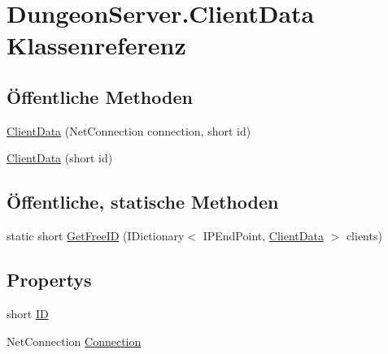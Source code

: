 \hypertarget{class_dungeon_server_1_1_client_data}{\section{Dungeon\-Server.\-Client\-Data Klassenreferenz}
\label{class_dungeon_server_1_1_client_data}
}
\subsection*{Öffentliche Methoden}
\begin{DoxyCompactItemize}
\item 
\hyperlink{class_dungeon_server_1_1_client_data_a0fbe7a06af78e568dbe1ee32dd9a2a30}{Client\-Data} (Net\-Connection connection, short id)
\item 
\hyperlink{class_dungeon_server_1_1_client_data_a0aaadda780c18994ef1cc35bf74afe3d}{Client\-Data} (short id)
\end{DoxyCompactItemize}
\subsection*{Öffentliche, statische Methoden}
\begin{DoxyCompactItemize}
\item 
static short \hyperlink{class_dungeon_server_1_1_client_data_aca19f78528851d2fcb837e663ee84f7d}{Get\-Free\-I\-D} (I\-Dictionary$<$ I\-P\-End\-Point, \hyperlink{class_dungeon_server_1_1_client_data}{Client\-Data} $>$ clients)
\end{DoxyCompactItemize}
\subsection*{Propertys}
\begin{DoxyCompactItemize}
\item 
short \hyperlink{class_dungeon_server_1_1_client_data_ac11c0fe5084cdc3d866a036e1258ea67}{I\-D}
\item 
Net\-Connection \hyperlink{class_dungeon_server_1_1_client_data_a643520d4aba602cd2690cd9bd610a073}{Connection}
\end{DoxyCompactItemize}


